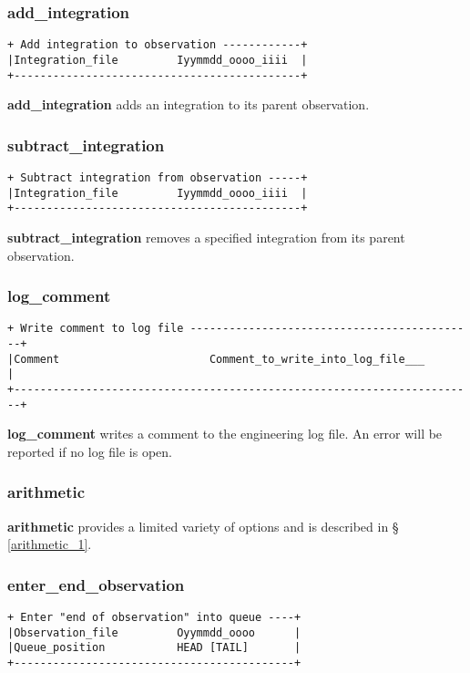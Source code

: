 {\subsubsection{add\_integration}
\begin{verbatim}
+ Add integration to observation ------------+
|Integration_file         Iyymmdd_oooo_iiii  |
+--------------------------------------------+
\end{verbatim}

{\bf add\_integration} adds an integration to its parent observation.

\subsubsection{subtract\_integration}
\begin{verbatim}
+ Subtract integration from observation -----+
|Integration_file         Iyymmdd_oooo_iiii  |
+--------------------------------------------+
\end{verbatim}

{\bf subtract\_integration} removes a specified integration from its
parent observation.

\subsubsection{log\_comment}
\label{log_comment}
\begin{verbatim}
+ Write comment to log file --------------------------------------------+
|Comment                       Comment_to_write_into_log_file___        |
+-----------------------------------------------------------------------+
\end{verbatim}

{\bf log\_comment} writes a comment to the engineering log file. An error
will be reported if no log file is open.

\subsubsection{arithmetic}
\label{arithmetic}

{\bf arithmetic} provides a limited variety of options and is described in \S 
\ref{arithmetic_1}.

\subsubsection{enter\_end\_observation}
\label{enter_end_observation}
\begin{verbatim}
+ Enter "end of observation" into queue ----+
|Observation_file         Oyymmdd_oooo      |
|Queue_position           HEAD [TAIL]       |
+-------------------------------------------+
\end{verbatim}

}
